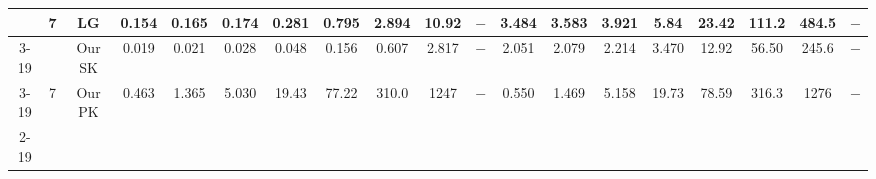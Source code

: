 \begin{table}[]
{\begin{tabular}{|c|c|c|cccccccccccccccc|}
& \multirow{3}{*}{7} & LG & \multicolumn{1}{c|}{0.154} & \multicolumn{1}{c|}{0.165} & \multicolumn{1}{c|}{0.174} & \multicolumn{1}{c|}{0.281} & \multicolumn{1}{c|}{0.795} & \multicolumn{1}{c|}{2.894} & \multicolumn{1}{c|}{10.92} & \multicolumn{1}{c|}{$-$} & \multicolumn{1}{c|}{3.484} & \multicolumn{1}{c|}{3.583} & \multicolumn{1}{c|}{3.921} & \multicolumn{1}{c|}{5.84} & \multicolumn{1}{c|}{23.42} & \multicolumn{1}{c|}{111.2} & \multicolumn{1}{c|}{484.5} & $-$ \\ \cline{3-19} 
 &  & Our SK & \multicolumn{1}{c|}{\cellcolor{blue!30}0.019} & \multicolumn{1}{c|}{\cellcolor{blue!30}0.021} & \multicolumn{1}{c|}{\cellcolor{blue!30}0.028} & \multicolumn{1}{c|}{\cellcolor{blue!30}0.048} & \multicolumn{1}{c|}{\cellcolor{blue!30}0.156} & \multicolumn{1}{c|}{\cellcolor{blue!30}0.607} & \multicolumn{1}{c|}{\cellcolor{blue!30}2.817} & \multicolumn{1}{c|}{$-$} & \multicolumn{1}{c|}{2.051} & \multicolumn{1}{c|}{2.079} & \multicolumn{1}{c|}{\cellcolor{blue!30}2.214} & \multicolumn{1}{c|}{\cellcolor{blue!30}3.470} & \multicolumn{1}{c|}{\cellcolor{blue!30}12.92} & \multicolumn{1}{c|}{\cellcolor{blue!30}56.50} & \multicolumn{1}{c|}{\cellcolor{blue!30}245.6} & $-$ \\ \cline{3-19} 
 & \multirow{-3}{*}{7} & Our PK & \multicolumn{1}{c|}{0.463} & \multicolumn{1}{c|}{1.365} & \multicolumn{1}{c|}{5.030} & \multicolumn{1}{c|}{19.43} & \multicolumn{1}{c|}{77.22} & \multicolumn{1}{c|}{310.0} & \multicolumn{1}{c|}{1247} & \multicolumn{1}{c|}{$-$} & \multicolumn{1}{c|}{\cellcolor{blue!30}0.550} & \multicolumn{1}{c|}{\cellcolor{blue!30}1.469} & \multicolumn{1}{c|}{5.158} & \multicolumn{1}{c|}{19.73} & \multicolumn{1}{c|}{78.59} & \multicolumn{1}{c|}{316.3} & \multicolumn{1}{c|}{1276} & $-$ \\ \cline{2-19} 


\end{tabular}}
\end{table}
